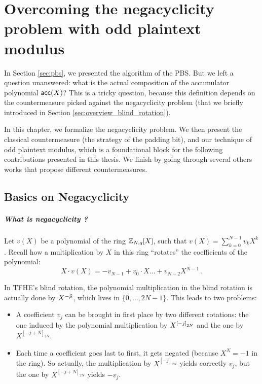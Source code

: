
\chapter[The Negacyclicity Problem]{Overcoming the negacyclicity problem with odd plaintext modulus}
\label{chap:negacyclicity}


In Section \ref{sec:pbs}, we presented the algorithm of the PBS. But we left a question unanswered: what is the actual composition of the accumulator polynomial $\textsf{acc}(X)$? This is a tricky question, because this definition depends on the countermeasure picked against the negacyclicity problem (that we briefly introduced in Section \ref{sec:overview_blind_rotation}). 


In this chapter, we formalize the negacyclicity problem. We then present the classical countermeasure (the strategy of the padding bit), and our technique of odd plaintext modulus, which is a foundational block for the following contributions presented in this thesis. We finish by going through several others works that propose different countermeasures.


\section{Basics on Negacyclicity}

\paragraph{What is negacyclicity ?}

Let $v(X)$ be a polynomial of the ring $\mathbb{Z}_{N,q}[X]$, such that $v(X) = \sum_{k=0}^{N-1} v_k X^k$. Recall how a multiplication by $X$  in this ring ``rotates'' the coefficients of the polynomial: \[X \cdot v(X) = - v_{N - 1} + v_0 \cdot X \dots + v_{N - 2} X^{N - 1}~.\]

In TFHE's blind rotation, the polynomial multiplication in the blind rotation is actually done by $X^{-\Tilde{\mu}}$, which lives in $\{0, \dots, 2N - 1\}$. This leads to two problems:

\begin{itemize}
	\item A coefficient $v_j$ can be brought in first place by two different rotations: the one induced by the polynomial multiplication by $X^{\left [ -j \right ]_{2N}}$ and the one by $X^{[-j + N]_{2N}}$.
	\item Each time a coefficient goes last to first, it gets negated (because $X^N = -1$ in the ring). So actually, the multiplication by $X^{[-j]_{2N}}$ yields correctly $v_j$, but the one by $X^{[-j + N]_{2N}}$ yields $-v_j$.
\end{itemize}


